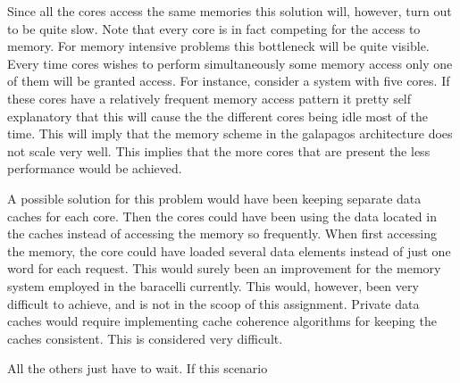 Since all the cores access the same memories this solution will, however, turn out to be quite slow. Note that every core is in fact competing for the access to memory. For memory intensive problems this bottleneck will be quite visible. Every time cores wishes to perform simultaneously some memory access only one of them will be granted access. For instance, consider a system with five cores. If these cores have a relatively frequent memory access pattern it pretty self explanatory that this will cause the the different cores being idle most of the time. This will imply that the memory scheme in the galapagos architecture does not scale very well. This implies that the more cores that are present the less performance would be achieved. 

A possible solution for this problem would have been keeping separate data caches for each core. Then the cores could have been using the data located in the caches instead of accessing the memory so frequently. When first accessing the memory, the core could have loaded several data elements instead of just one word for each request. This would surely been an improvement for the memory system employed in the baracelli currently. This would, however, been very difficult to achieve, and is not in the scoop of this assignment. Private data caches would require implementing cache coherence algorithms for keeping the caches consistent. This is considered very difficult. 









All the others just have to wait. If this scenario 









\section{}
